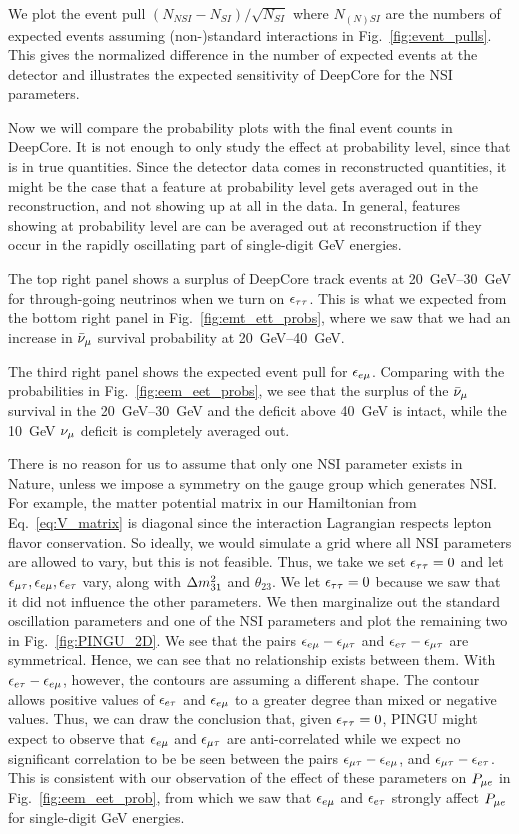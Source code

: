 {{We plot the event pull $(N_{NSI} - N_{SI})/\sqrt{N_{SI}}$ where $N_{(N)SI}$ are the numbers of expected events
assuming (non-)standard interactions in Fig.~\ref{fig:event_pulls}. This gives the normalized difference in the
number of expected events at the detector and illustrates the expected sensitivity of DeepCore for the NSI parameters.

Now we will compare the probability plots with the final event counts in DeepCore. It is not enough to only study the effect at probability level, since that is in true quantities. 
Since the detector data comes in reconstructed quantities, it might be the case that a feature at probability level gets averaged out in the reconstruction, and not showing up at all in the data. 
In general, features showing at probability level are can be 
averaged out at reconstruction if they occur in the rapidly oscillating part of single-digit \si{\GeV} energies. 

The top right panel shows a surplus of DeepCore track events at \SIrange{20}{30}{\GeV} for through-going neutrinos when we turn on $\epsilon_{\tau\tau}$. This is what we expected from the bottom right panel in Fig.~\ref{fig:emt_ett_probs}, where we saw that we had an increase in $\bar{\nu}_\mu$ survival probability at \SIrange{20}{40}{\GeV}. 

The third right panel shows the expected event pull for $\epsilon_{e\mu}$. Comparing with the probabilities in Fig.~\ref{fig:eem_eet_probs}, we see that the surplus of the $\bar{\nu}_\mu$ survival in the \SIrange{20}{30}{\GeV} and the deficit above \SI{40}{\GeV} is intact, while the \SI{10}{\GeV} $\nu_\mu$ deficit is completely averaged out.

There is no reason for us to assume that only one NSI parameter exists in Nature, unless we impose a symmetry on the gauge group which generates NSI. For example, the matter potential matrix in our Hamiltonian from Eq.~\eqref{eq:V_matrix} is diagonal since the 
interaction Lagrangian respects lepton flavor conservation. So ideally, we would simulate a grid where all NSI parameters are allowed to vary, 
but this is not feasible. Thus, we take we set $\epsilon_{\tau\tau} = 0$ and let $\epsilon_{\mu\tau},\epsilon_{e\mu},\epsilon_{e\tau}$ vary, along with $\dm[31]$ and $\theta_{23}$. We let $\epsilon_{\tau\tau}=0$ because we saw that it did not influence the other parameters. 
We then marginalize out the standard oscillation parameters and one of the NSI parameters and plot the remaining two in Fig.~\ref{fig:PINGU_2D}. We see that the pairs $\epsilon_{e\mu} - \epsilon_{\mu\tau}$ and $\epsilon_{e\tau} - \epsilon_{\mu\tau}$ are symmetrical. 
Hence, we can see that no relationship exists between them. With $\epsilon_{e\tau} - \epsilon_{e\mu}$, however, the contours are assuming a different shape. The contour allows positive values of $\epsilon_{e\tau}$ and $\epsilon_{e\mu}$ to a greater degree than mixed or negative values.
Thus, we can draw the conclusion that, given $\epsilon_{\tau\tau} = 0$, PINGU might expect to observe that $\epsilon_{e\mu}$ and $\epsilon_{\mu\tau}$ are anti-correlated while we expect no significant correlation
to be be seen between the pairs $\epsilon_{\mu\tau} - \epsilon_{e\mu}$, and $\epsilon_{\mu\tau} - \epsilon_{e\tau}$. This is consistent with our observation of the effect of these parameters on $P_{\mu e}$ in  Fig.~\ref{fig:eem_eet_prob}, from which we 
saw that $\epsilon_{e\mu}$ and $\epsilon_{e\tau}$ strongly affect $P_{\mu e}$ for single-digit \si{\GeV} energies.

}}
